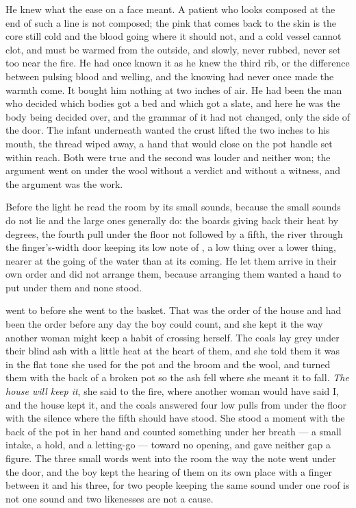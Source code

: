 He knew what the ease on a face meant. A patient who looks composed at the end of such a line is not composed; the pink that comes back to the skin is the core still cold and the blood going where it should not, and a cold vessel cannot clot, and must be warmed from the outside, and slowly, never rubbed, never set too near the fire. He had once known it as he knew the third rib, or the difference between pulsing blood and welling, and the knowing had never once made the warmth come. It bought him nothing at two inches of air. He had been the man who decided which bodies got a bed and which got a slate, and here he was the body being decided over, and the grammar of it had not changed, only the side of the door. The infant underneath wanted the crust lifted the two inches to his mouth, the thread wiped away, a hand that would close on the pot handle set within reach. Both were true and the second was louder and neither won; the argument went on under the wool without a verdict and without a witness, and the argument was the work.

Before the light he read the room by its small sounds, because the small sounds do not lie and the large ones generally do: the boards giving back their heat by degrees, the fourth pull under the floor not followed by a fifth, the river through the finger's-width door keeping its low note of , a low thing over a lower thing, nearer at the going of the water than at its coming. He let them arrive in their own order and did not arrange them, because arranging them wanted a hand to put under them and none stood.

\scenebreak

 went to  before she went to the basket. That was the order of the house and had been the order before any day the boy could count, and she kept it the way another woman might keep a habit of crossing herself. The coals lay grey under their blind ash with a little heat at the heart of them, and she told them it was  in the flat tone she used for the pot and the broom and the wool, and turned them with the back of a broken pot so the ash fell where she meant it to fall. \emph{The house will keep it}, she said to the fire, where another woman would have said I, and the house kept it, and the coals answered four low pulls from under the floor with the silence where the fifth should have stood. She stood a moment with the back of the pot in her hand and counted something under her breath --- a small intake, a hold, and a letting-go --- toward no opening, and gave neither gap a figure. The three small words went into the room the way the note went under the door, and the boy kept the hearing of them on its own place with a finger between it and his three, for two people keeping the same sound under one roof is not one sound and two likenesses are not a cause.

